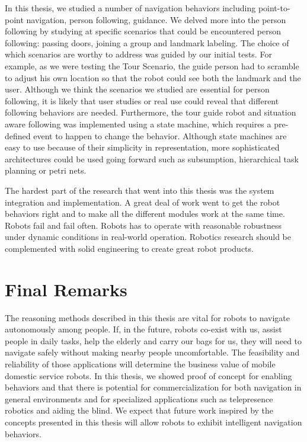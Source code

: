 In this thesis, we studied a number of navigation behaviors including point-to-point navigation, person following, guidance. We delved more into the person following by studying at specific scenarios that could be encountered person following: passing doors, joining a group and landmark labeling. The choice of which scenarios are worthy to address was guided by our initial tests. For example, as we were testing the Tour Scenario, the guide person had to scramble to adjust his own location so that the robot could see both the landmark and the user. Although we think the scenarios we studied are essential for person following, it is likely that user studies or real use could reveal that different following behaviors are needed. Furthermore, the tour guide robot and situation aware following was implemented using a state machine, which requires a pre-defined event to happen to change the behavior. Although state machines are easy to use because of their simplicity in representation, more sophisticated architectures could be used going forward such as subsumption, hierarchical task planning or petri nets.

The hardest part of the research that went into this thesis was the system integration and implementation. A great deal of work went to get the robot behaviors right and to make all the different modules work at the same time. Robots fail and fail often. Robots has to operate with reasonable robustness under dynamic conditions in real-world operation. Robotics research should be complemented with solid engineering to create great robot products.

\section{Final Remarks}

The reasoning methods described in this thesis are vital for robots to navigate autonomously among people. If, in the future, robots co-exist with us, assist people in daily tasks, help the elderly and carry our bags for us, they will need to navigate safely without making nearby people uncomfortable. The feasibility and reliability of those applications will determine the business value of mobile domestic service robots. In this thesis, we showed proof of concept for enabling behaviors and that there is potential for commercialization for both navigation in general environments and for specialized applications such as telepresence robotics and aiding the blind. We expect that future work inspired by the concepts presented in this thesis will allow robots to exhibit intelligent navigation behaviors.